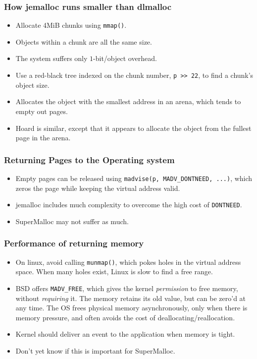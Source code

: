 \documentclass[xcolor=dvipsnames,14pt]{beamer}
\begin{document}
\begin{frame}
\frametitle{How jemalloc runs smaller than dlmalloc}

\begin{itemize}
\item Allocate 4MiB chunks using \texttt{mmap()}.
\item Objects within a chunk are all the same size. 
\item The system suffers only $1$-bit/object overhead.
\item Use a red-black tree indexed on the chunk number, \texttt{p >> 22}, to find a chunk's object size.
\item Allocates the object with the smallest address in an arena,
which tends to empty out pages.
\item Hoard is similar, except that it appears to allocate the object from the fullest page in the arena.
\end{itemize}
\end{frame}

\begin{frame}
\frametitle{Returning Pages to the Operating system}

\begin{itemize}
\item Empty pages can be released using
\texttt{madvise(p, MADV_DONTNEED, ...)}, which zeros the page while keeping the virtual address valid.

\item jemalloc includes much complexity to overcome the high cost of
  \texttt{DONTNEED}.

\item SuperMalloc may not suffer as much.
\end{itemize}
\end{frame}

\begin{frame}
\frametitle{Performance of returning memory}

\begin{itemize}
\item On linux, avoid calling \texttt{munmap()}, which pokes
  holes in the virtual address space.  When many holes exist, Linux is slow to
  find a free range.

\item BSD offers \texttt{MADV_FREE}, which
  gives the kernel \textit{permission} to free memory, without \textit{requiring} it. The memory retains its old value, but can be zero'd at any time.
  The OS frees physical memory asynchronously, only when there is memory pressure, and often avoids the cost of
  deallocating/reallocation.

\item Kernel should deliver an event to the application when memory is tight.

\item Don't yet know if this is important for SuperMalloc.
\end{itemize}
\end{frame}
\end{document}
